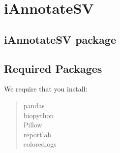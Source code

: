 \documentclass[letterpaper,10pt,english]{sphinxmanual}
\begin{document}
\chapter{iAnnotateSV}
\label{\detokenize{modules::doc}}\label{\detokenize{modules:iannotatesv-annotation-of-structural-variants-detected-from-ngs}}\label{\detokenize{modules:iannotatesv}}

\section{iAnnotateSV package}
\label{\detokenize{iAnnotateSV:iannotatesv-package}}\label{\detokenize{iAnnotateSV::doc}}

\section{Required Packages}
\label{\detokenize{iAnnotateSV:required-packages}}
We require that you install:
\begin{quote}\begin{description}
\item[{pandas}] \leavevmode
{}

\item[{biopython}] \leavevmode
{}

\item[{Pillow}] \leavevmode
{}

\item[{reportlab}] \leavevmode
{}

\item[{coloredlogs}] \leavevmode
{}

\end{description}\end{quote}
\end{document}
